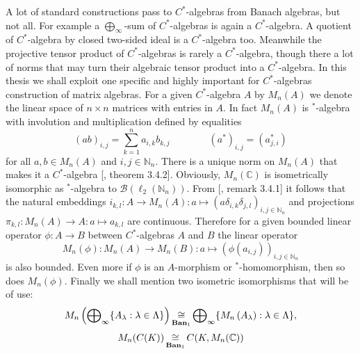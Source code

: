 A lot of standard constructions pass to $C^*$-algebras from Banach algebras, but not all. For example a $\bigoplus_\infty$-sum of $C^*$-algebras is again a $C^*$-algebra. A quotient of $C^*$-algebra by closed two-sided ideal is a $C^*$-algebra too. Meanwhile the projective tensor product of $C^*$-algebras is rarely a $C^*$-algebra, though there a lot of norms that may turn their algebraic tensor product into a $C^*$-algebra. In this thesis we shall exploit one specific and highly
important for $C^*$-algebras construction of matrix algebras. For a given $C^*$-algebra $A$ by $M_n(A)$ we denote the linear space of $n\times n$ matrices with entries in $A$. In fact $M_n(A)$ is ${}^*$-algebra with involution and multiplication defined by equalities 
$$
(ab)_{i,j}=\sum_{k=1}^n a_{i,k}b_{k,j}
\qquad\qquad
(a^*)_{i,j}=(a_{j,i}^*)
$$ 
for all $a,b\in M_n(A)$ and $i,j\in\mathbb{N}_n$. There is a unique norm on $M_n(A)$ that makes it a $C^*$-algebra [\cite{MurphyCStarAlgsAndOpTh}, theorem 3.4.2]. Obviously, $M_n(\mathbb{C})$ is isometrically isomorphic as ${}^*$-algebra to $\mathcal{B}(\ell_2(\mathbb{N}_n))$. From [\cite{MurphyCStarAlgsAndOpTh}, remark 3.4.1] it follows that the natural embeddings $i_{k,l}:A\to M_n(A):a\mapsto(a\delta_{i,k}\delta_{j,l})_{i,j\in\mathbb{N}_n}$ and projections $\pi_{k,l}:M_n(A)\to A:a\mapsto a_{k,l}$ are continuous. Therefore for a given bounded linear operator $\phi:A\to B$ between $C^*$-algebras $A$ and $B$ the linear operator 
$$
M_n(\phi):M_n(A)\to M_n(B):a\mapsto (\phi(a_{i,j}))_{i,j\in\mathbb{N}_n}
$$ 
is also bounded. Even more if $\phi$ is an $A$-morphism or ${}^*$-homomorphism, then so does $M_n(\phi)$. Finally we shall mention two isometric isomorphisms that will be of use:
$$
M_n\left(\bigoplus\nolimits_\infty\{A_\lambda:\lambda\in\Lambda\}\right)
\mathop{\mathbin{\cong}}\limits_{\mathbf{Ban}_1}
\bigoplus\nolimits_\infty\{M_n\left(A_\lambda\right):\lambda\in\Lambda\},
$$
$$
M_n(C(K))\mathop{\mathbin{\cong}}\limits_{\mathbf{Ban}_1}C(K,M_n(\mathbb{C}))
$$

